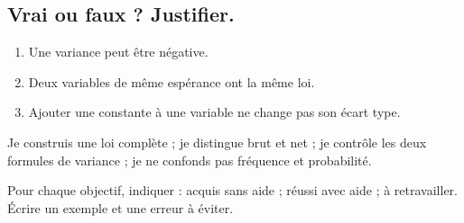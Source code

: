 \subsection*{Vrai ou faux ? Justifier.}\label{C08-VF}
\begin{enumerate}
\item Une variance peut être négative.
\item Deux variables de même espérance ont la même loi.
\item Ajouter une constante à une variable ne change pas son écart type.
\end{enumerate}
\begin{keypoint}Je construis une loi complète ; je distingue brut et net ; je contrôle les deux formules de variance ; je ne confonds pas fréquence et probabilité.

Pour chaque objectif, indiquer : acquis sans aide ; réussi avec aide ; à retravailler. Écrire un exemple et une erreur à éviter.\end{keypoint}
\endgroup
\ifmxteacher{}\fi
